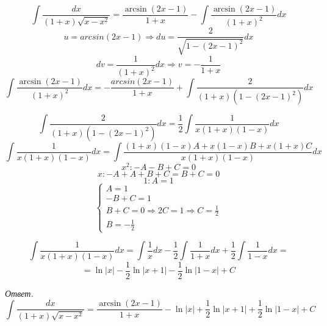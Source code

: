 \documentclass{article}
\begin{document}
	$$\int\frac{dx}{(1+x)\sqrt{x-x^2}} = \frac{\arcsin(2x - 1)}{1 + x} - \int\frac{\arcsin(2x - 1)}{(1 + x)^2}dx$$
	$$u = arcsin(2x - 1) \Rightarrow du = \frac{2}{\sqrt{1 - (2x - 1)^2}}dx$$
	$$dv = \frac{1}{(1 + x)^2}dx \Rightarrow v = -\frac{1}{1 + x}$$
	$$\int\frac{\arcsin(2x - 1)}{(1 + x)^2}dx = -\frac{arcsin(2x - 1)}{1 + x} + \int\frac{2}{(1 + x)(1 - (2x - 1)^2)}dx$$

	$$\int\frac{2}{(1 + x)(1 - (2x - 1)^2)}dx = \frac{1}{2}\int\frac{1}{x(1 + x)(1 - x)}dx$$
	$$\int\frac{1}{x(1 + x)(1 - x)}dx = \int\frac{(1 + x)(1 - x)A + x(1 - x)B + x(1 + x)C}{x(1 + x)(1 - x)}dx$$
	$$x^2: -A - B + C = 0$$
	$$x: -A + A + B + C = B + C = 0$$
	$$1: A = 1$$
	\begin{equation*}
		\begin{cases}
			A = 1\\
			-B + C = 1\\
			B + C = 0 \Rightarrow 2C = 1 \Rightarrow C = \frac{1}{2}\\
			B = -\frac{1}{2}
		\end{cases}
	\end{equation*}

	$$\int\frac{1}{x(1 + x)(1 - x)}dx = \int\frac{1}{x}dx - \frac{1}{2}\int\frac{1}{1 + x}dx + \frac{1}{2}\int\frac{1}{1 - x}dx =$$
	$$= \ln|x| - \frac{1}{2}\ln|x + 1| - \frac{1}{2}\ln|1 - x| + C$$

	\emph{Ответ.} $$\int\frac{dx}{(1+x)\sqrt{x-x^2}} = \frac{\arcsin(2x - 1)}{1 + x} - \ln|x| + \frac{1}{2}\ln|x + 1| + \frac{1}{2}\ln|1 - x| + C$$
\end{document}
